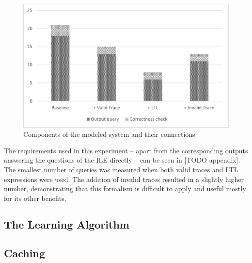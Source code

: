 \begin{figure}[!ht] 
	\centering
	\includegraphics[width=130mm, keepaspectratio]{figures/evaluation_trafficlightformalism.png}
	\caption{Components of the modeled system and their connections} 
	\label{fig_eval_trafficlightformalisms}
\end{figure}

The requirements used in this experiment -- apart from the corresponding outputs answering the questions of the ILE directly -- can be seen in [TODO appendix]. The smallest number of queries was measured when both valid traces and LTL expressions were used. The addition of invalid traces resulted in a slightly higher number, demonstrating that this formalism is difficult to apply and useful mostly for its other benefits.  
 
\subsection{The Learning Algorithm} \label{subs_evallearningalgo}

\subsection{Caching} \label{subs_evalcaching}
